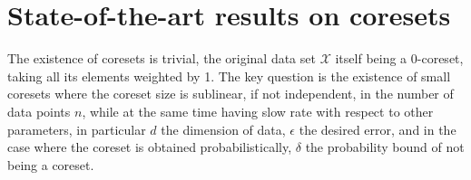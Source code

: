 







    

\section{State-of-the-art results on coresets}
The existence of coresets is trivial, the original data set $\mathcal{X}$ itself  being a $0$-coreset, taking all its elements weighted by 1. The key question is the existence of small coresets where the coreset size is sublinear, if not independent, in the number of data points $n$, while at the same time having slow rate with respect to other parameters, in particular $d$ the dimension of data, $\epsilon$ the desired error, and in the case where the coreset is obtained probabilistically, $\delta$ the probability bound of not being a coreset.


